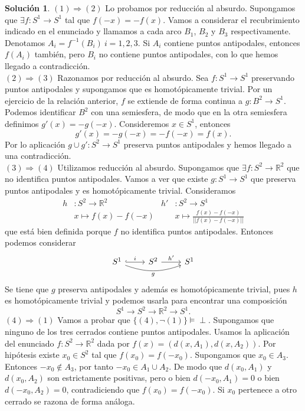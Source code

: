 \documentclass{article}
\theoremstyle{plain}
\theoremstyle{definition}
\newtheorem*{sol*}{Solución}
\newcommand{\R}{\mathbb{R}}
\begin{document}
\begin{sol*}
$\boxed{(1) \Rightarrow (2)}$ Lo probamos por reducción al absurdo. Supongamos que $\exists f:S^1\to S^1$ tal que $f(-x)=-f(x)$. Vamos a considerar el recubrimiento indicado en el enunciado y llamamos a cada arco $B_1$, $B_2$ y $B_3$ respectivamente. Denotamos $A_i=f^{-1}(B_i)\ i=1,2,3$. Si $A_i$ contiene puntos antipodales, entonces $f(A_i)$ también, pero $B_i$ no contiene puntos antipodales, con lo que hemos llegado a contradicción.\\
$\boxed{(2) \Rightarrow (3)}$ Razonamos por reducción al absurdo. Sea $f: S^1\to S^1$ preservando puntos antipodales y supongamos que es homotópicamente trivial. Por un ejercicio de la relación anterior, $f$ se extiende de forma continua a $g:B^2 \to S^1$. Podemos identificar $B^2$ con una semiesfera, de modo que en la otra semiesfera definimos $g'(x)=-g(-x)$. Consideremos $x\in S^1$, entonces
\[ g'(x)=-g(-x)=-f(-x)=f(x).\]
Por lo aplicación $g\cup g' :S^2\to S^1$ preserva puntos antipodales y hemos llegado a una contradicción.\\
$\boxed{(3) \Rightarrow (4)}$ Utilizamos reducción al absurdo. Supongamos que $\exists f:S^2\to\R^2$ que no identifica puntos antipodales. Vamos a ver que existe $g:S^1\to S^1$ que preserva puntos antipodales y es homotópicamente trivial. Consideramos 
\begin{align*}
h&:S^2\to\R^2 & h'&:S^2\longrightarrow S^1\\
 &x\longmapsto f(x)-f(-x) & &x\longmapsto\frac{f(x)-f(-x)}{||f(x)-f(-x)||}
\end{align*}
que está bien definida porque $f$ no identifica puntos antipodales. Entonces podemos considerar
\[
\begin{tikzcd}
S^1\arrow[r,"i",hookrightarrow]\arrow[rr,"g"', bend right=20]& S^2\arrow[r,"h'"]& S^1
\end{tikzcd}
\]
Se tiene que $g$ preserva antipodales y además es homotópicamente trivial, pues $h$ es homotópicamente trivial y podemos usarla para encontrar una composición $$S^1\to S^2\to\R^2\to S^1.$$
$\boxed{(4) \Rightarrow (1)}$ Vamos a probar que $\{(4),\neg (1)\}\models \perp$. Supongamos que ninguno de los tres cerrados contiene puntos antipodales. Usamos la aplicación del enunciado $f: S^2\to \mathbb{R}^2$ dada por $f(x) = (d(x,A_1), d(x,A_2))$. Por hipótesis existe $x_0\in S^2$ tal que $f(x_0)=f(-x_0)$. Supongamos que $x_0\in A_3$. Entonces $-x_0\notin A_3$, por tanto $-x_0\in A_1\cup A_2$. De modo que $d(x_0,A_1)$ y $d(x_0,A_2)$ son estrictamente positivas, pero o bien $d(-x_0,A_1)=0$ o bien $d(-x_0,A_2)=0$, contradiciendo que $f(x_0)=f(-x_0)$. Si $x_0$ pertenece a otro cerrado se razona de forma análoga.
\end{sol*}
\end{document}
